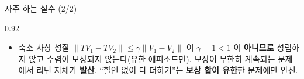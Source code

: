 \begin{frame}{자주 하는 실수 (2/2)}
\begin{center}\begin{varwidth}{0.92\textwidth}
  \begin{itemize}
    \item {} 축소 사상
      성질 $\|TV_1 - TV_2\| \le \gamma \|V_1 - V_2\|$ 이
      $\gamma = 1 < 1$ 이 \textbf{아니므로} 성립하지 않고
      수렴이 보장되지 않는다(유한 에피소드만). 보상이 무한히
      계속되는 문제에서 리턴 자체가 \textbf{발산}. ``할인 없이
      다 더하기''는 \textbf{보상 합이 유한}한 문제에만 안전.
    
  \end{itemize}
\end{varwidth}\end{center}
\end{frame}
